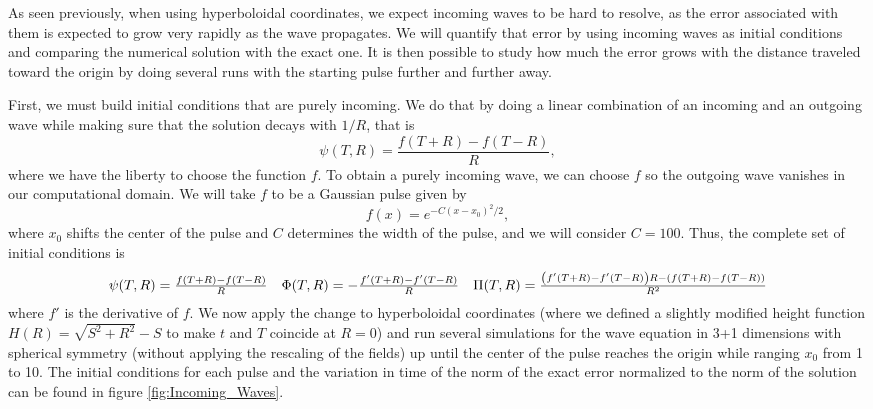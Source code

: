As seen previously, when using hyperboloidal coordinates, we expect incoming waves to be hard to resolve, as the error associated with them is expected to grow very rapidly as the wave propagates. We will quantify that error by using incoming waves as initial conditions and comparing the numerical solution with the exact one. It is then possible to study how much the error grows with the distance traveled toward the origin by doing several runs with the starting pulse further and further away.

First, we must build initial conditions that are purely incoming. We do that by doing a linear combination of an incoming and an outgoing wave while making sure that the solution decays with $1/R$, that is
%
\begin{equation}
    \psi(T,R) = \frac{f(T+R) - f(T-R)}{R},
\end{equation}
%
where we have the liberty to choose the function $f$. To obtain a purely incoming wave, we can choose $f$ so the outgoing wave vanishes in our computational domain. We will take $f$ to be a Gaussian pulse given by
%
\begin{equation}
    f(x) = e^{-C (x - x_0)^2/2},
\end{equation}
%
where $x_0$ shifts the center of the pulse and $C$ determines the width of the pulse, and we will consider $C = 100$. Thus, the complete set of initial conditions is 
%
\begin{equation}
    \begin{array}{c c c}
        \psi(T,R) = \frac{f(T+R) - f(T-R)}{R} & \Phi(T,R) = -\frac{f'(T+R) - f'(T-R)}{R} & \Pi(T,R) = \frac{\left(f'(T+R) - f'(T-R)\right)R - \left(f(T+R) - f(T-R)\right)}{R^2}
    \end{array}
    \label{eq:Incoming_initial_conditions}
\end{equation}
%
where $f'$ is the derivative of $f$. We now apply the change to hyperboloidal coordinates (where we defined a slightly modified height function $H(R) = \sqrt{S^2 + R^2} - S$ to make $t$ and $T$ coincide at $R=0$) and run several simulations for the wave equation in 3+1 dimensions with spherical symmetry (without applying the rescaling of the fields) up until the center of the pulse reaches the origin while ranging $x_0$ from 1 to 10. The initial conditions for each pulse and the variation in time of the norm of the exact error normalized to the norm of the solution can be found in figure \ref{fig:Incoming_Waves}. 

